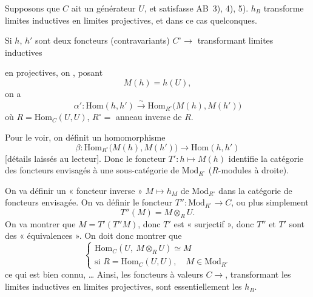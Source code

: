 \documentclass[11pt,a4paper]{article}
\begin{document}
Supposons que $C$ ait un générateur $U$, et \struck{\ill{}} satisfasse AB~3),
4), 5).  $h_{B}$ transforme limites inductives en limites
projectives, et dans ce cas quelconques. \ill{}

Si $h$, $h'$ sont deux foncteurs (contravariants) $C^{\circ} \to {}$%
 \ill{} transformant limites inductives

en projectives, on , posant
\[
  M(h) = h(U) ,
\]
on a
\[
  \alpha' : \mathrm{Hom}(h, h') \xrightarrow{\ \sim\ }
  \mathrm{Hom}_{R^{\circ}}\bigl( M(h), M(h') \bigr)
\]
où $R = \mathrm{Hom}_{C}(U, U)$, $R^{\circ} = $ anneau inverse de $R$.

Pour le voir, on définit un homomorphisme
\[
  \beta : \mathrm{Hom}_{R^{\circ}}\bigl( M(h), M(h') \bigr)
  \longrightarrow \mathrm{Hom}(h, h')
\]
[détails laissés au lecteur]. Donc le foncteur $T' : h \mapsto M(h)$ identifie la
catégorie des foncteurs \struck{\ill{}} envisagés à une sous-catégorie de
$\mathrm{Mod}_{R^{\circ}}$ ($R$-modules à droite).

On va définir un « foncteur inverse » $M \mapsto h_{M}$ de
$\mathrm{Mod}_{R^{\circ}}$ dans la catégorie de foncteurs envisagée. On va
définir  le foncteur $T'' : \mathrm{Mod}_{R^{\circ}} \to C$, ou plus
simplement
\[
  T''(M) = M \otimes_{R} U .
\]
On va montrer que  $M = T'$$(T''M)$, donc $T'$ est
« surjectif », donc $T''$ et $T'$ sont
des « équivalences ». On doit donc montrer que
\[
  \left\{
  \begin{array}{l}
    \mathrm{Hom}_{C}(U,\ M \otimes_{R} U) \simeq M \\[2pt]
    \text{si } R = \mathrm{Hom}_{C}(U, U) , \quad M \in \mathrm{Mod}_{R^{\circ}}
  \end{array}
  \right.
\]
ce qui est bien connu,  \ill{} \ldots{} Ainsi, les foncteurs
   à valeurs
$C \to {}$, transformant les limites inductives en
limites projectives, sont essentiellement les $h_{B}$.
\end{document}
